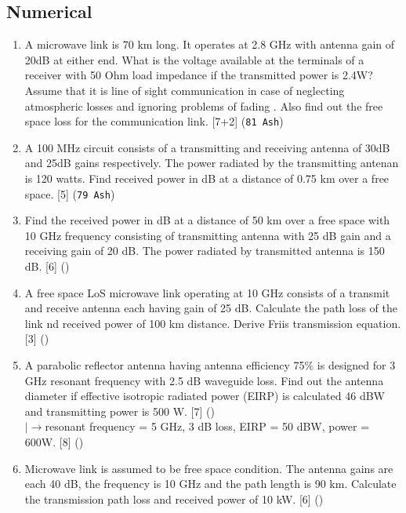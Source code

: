 \documentclass[12pt]{article}
\newcommand{\lb}{\\$\left|\rightarrow\right.$}
\begin{document}
  \subsection{Numerical}
    \begin{enumerate}
      \item A microwave link is 70 km long. It operates at 2.8 GHz with antenna gain of 20dB at either end. What is the voltage available at the terminals of a receiver with 50 Ohm load impedance if the transmitted power is 2.4W? Assume that it is line of sight communication in case of neglecting atmospheric losses and ignoring problems of fading . Also find out the free space loss for the communication link. \hfill[7+2] (\texttt{81 Ash})

      \item A 100 MHz circuit consists of a transmitting and receiving antenna of 30dB and 25dB gains respectively. The power radiated by the transmitting antenan is 120 watts. Find received power in dB at a distance of 0.75 km over a free space. \hfill [5] (\texttt{79 Ash})

      \item Find the received power in dB at a distance of 50 km over a free space with 10 GHz frequency consisting of transmitting antenna with 25 dB gain and a receiving gain of 20 dB. The power radiated by transmitted antenna is 150 dB. \hfill [6] ()

      \item A free space LoS microwave link operating at 10 GHz consists of a transmit and receive antenna each having gain of 25 dB. Calculate the path loss of the link nd received power of 100 km distance. Derive Friis transmission equation. \hfill [3] ()

      \item A parabolic reflector antenna having antenna efficiency 75\% is designed for 3 GHz resonant frequency with 2.5 dB waveguide loss. Find out the antenna diameter if effective isotropic radiated power (EIRP) is calculated 46 dBW and transmitting power is 500 W. \hfill [7] ()
        \lb resonant frequency = 5 GHz, 3 dB loss, EIRP = 50 dBW, power = 600W. \hfill [8] ()

      \item Microwave link is assumed to be free space condition. The antenna gains are each 40 dB, the frequency is 10 GHz and the path length is 90 km. Calculate the transmission path loss and received power of 10 kW. \hfill [6] ()


\end{enumerate}
\end{document}
